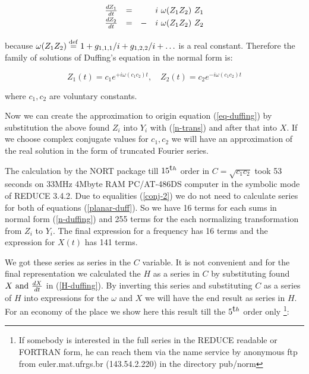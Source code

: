 $$
\begin{array}{lccl}
\frac{\mathstrut dZ_1}{\mathstrut dt}& = &  &i \ \omega(Z_1 Z_2) \ Z_1 \\
\frac{\mathstrut dZ_2}{\mathstrut dt}& = & -&i \ \omega(Z_1 Z_2) \ Z_2  
\end{array}
$$

\noindent
because $\omega(Z_1 Z_2) \stackrel{\rm def}{=} 1 + g_{1,1,1}/i + 
g_{1,2,2}/i + \ldots$ 
is a real constant. Therefore the family of solutions of Duffing's 
equation in the normal form is:

$$ 
Z_1(t) = c_1 e^{+ i \omega(c_1 c_2) t}, \quad
Z_2(t) = c_2 e^{- i \omega(c_1 c_2) t}  
$$

\noindent
where $c_1, c_2$ are voluntary constants.

Now we can create the approximation to origin equation 
(\ref{eq-duffing}) by substitution the above found $Z_i$ into $Y_i$ 
with (\ref{n-trans})
and after that into $X$. If we choose complex conjugate values for 
$c_1, c_2$ we will have an approximation of the real solution in the 
form of truncated Fourier series.

   The calculation by the NORT package till $15^{\mbox th}$ order in $C = 
\sqrt{c_1 c_2}$ took 53 seconds on 33MHz 4Mbyte RAM  PC/AT-486DS 
computer in the symbolic mode of REDUCE 3.4.2. Due to equalities
(\ref{conj-2}) we do not need to calculate series for both of 
equations (\ref{planar-duff}). So we have 16 terms for  
each sums in normal form (\ref{n-duffing}) and 255 terms for
the each normalizing transformation from $Z_i$ to $Y_i$. The final
expression for a frequency has 16 terms and the expression for $X(t)$ 
has 141 terms. 

We got these series as series in the $C$ variable. It is not convenient
and for the final representation we calculated the $H$ as a series in 
$C$ by substituting found $X \mbox{ and } {dX \over dt}$ in
(\ref{H-duffing}). By inverting this series and substituting $C$ as 
a series of $H$ into expressions for the $\omega$ and $X$ we will
have the end result as series in $H$. For an economy of the place
we show here this result till the $5^{\mbox th}$ order only 
\footnote{If somebody
is interested in the full series in the REDUCE readable or FORTRAN
form, he can reach them via the name service by anonymous ftp from
euler.mat.ufrgs.br (143.54.2.220) in the directory pub/norm}:



